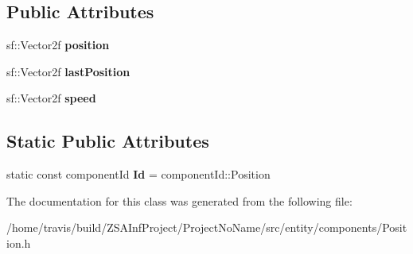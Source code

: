 \subsection*{Public Attributes}
\begin{DoxyCompactItemize}
\item 
\hypertarget{classPositionComponent_a98149921fa43d0c82e6a79a3b96cbfef}{sf\-::\-Vector2f {\bfseries position}}\label{classPositionComponent_a98149921fa43d0c82e6a79a3b96cbfef}

\item 
\hypertarget{classPositionComponent_ada7eda72ac5839af96457c6764a468c7}{sf\-::\-Vector2f {\bfseries last\-Position}}\label{classPositionComponent_ada7eda72ac5839af96457c6764a468c7}

\item 
\hypertarget{classPositionComponent_aa9ce8cff0358ee1befbf9695aa3d7ab4}{sf\-::\-Vector2f {\bfseries speed}}\label{classPositionComponent_aa9ce8cff0358ee1befbf9695aa3d7ab4}

\end{DoxyCompactItemize}
\subsection*{Static Public Attributes}
\begin{DoxyCompactItemize}
\item 
\hypertarget{classPositionComponent_a8eb32e3b88cfbd10e1837baed9ba71c6}{static const component\-Id {\bfseries Id} = component\-Id\-::\-Position}\label{classPositionComponent_a8eb32e3b88cfbd10e1837baed9ba71c6}

\end{DoxyCompactItemize}


The documentation for this class was generated from the following file\-:\begin{DoxyCompactItemize}
\item 
/home/travis/build/\-Z\-S\-A\-Inf\-Project/\-Project\-No\-Name/src/entity/components/Position.\-h\end{DoxyCompactItemize}
